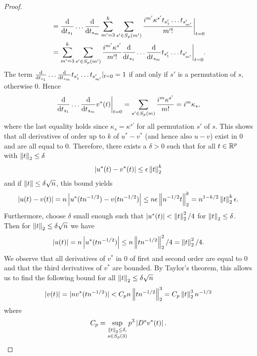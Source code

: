 \begin{proof}
\begin{align*}
        &= \frac{\text{d}}{\text{d} t_{s_1}}\ldots\frac{\text{d}}{\text{d} t_{s_m}} \sum_{m'=3}^k \sum_{s' \in S_p(m')} \frac{i^{m'}\kappa^{s'}t_{s'_1}\ldots t_{s'_{m'}}}{m'!} \bigg|_{t=0} \\
        &= \sum_{m'=3}^k \sum_{s' \in S_p(m')} \frac{i^{m'}\kappa^{s'}}{m'!} \frac{\text{d}}{\text{d} t_{s_1}}\ldots\frac{\text{d}}{\text{d} t_{s_m}}t_{s'_1}\ldots t_{s'_{m'}} \bigg|_{t=0}.
    \end{align*}
    The term $\frac{\text{d}}{\text{d} t_{s_1}}\ldots\frac{\text{d}}{\text{d} t_{s_m}}t_{s'_1}\ldots t_{s'_{m'}} |_{t=0} = 1$ if and only if $s'$ is a permutation of $s$, otherwise 0. Hence
    \begin{equation*}
        \frac{\text{d}}{\text{d} t_{s_1}}\ldots\frac{\text{d}}{\text{d} t_{s_m}} v^*(t) \bigg|_{t=0} 
        = \sum_{s' \in S_p(m)} \frac{i^m\kappa^{s'}}{m!}
        = i^m\kappa_s,
    \end{equation*}
    where the last equality holds since $\kappa_s = \kappa^{s'}$ for all permutation $s'$ of $s$. 
    This shows that all derivatives of order up to $k$ of $u^* - v^*$ (and hence also $u - v$) exist in 0 and are all equal to 0. Therefore, there exists a $\delta > 0$ such that for all $t \in {\mathbb{R}^p}$ with $\left\lVert t\right\rVert_2 \leq \delta$
    \begin{equation*}
        \left|u^*(t) - v^*(t)\right| \leq \epsilon\left\lVert t\right\rVert_2^k
    \end{equation*}
    and if $\left\lVert t\right\rVert \leq \delta \sqrt{n}$, this bound yields
    \begin{equation*}
        \left|u(t) - v(t)\right| = n\left|u^*(t n^{-1/2}) - v(t n^{-1/2})\right| \leq n\epsilon\left\lVert n^{-1/2}t\right\rVert_2^k = n^{1-k/2}\left\lVert t\right\rVert_2^k\epsilon.
    \end{equation*}
    Furthermore, choose $\delta$ small enough such that $\left|u^*(t)\right| < \left\lVert t\right\rVert_2^2/4$ for $\left\lVert t\right\rVert_2 \leq \delta$. Then for $\left\lVert t\right\rVert_2 \leq \delta\sqrt{n}$ we have
    \begin{equation*}
        \left|u(t)\right| = n\left|u^*(t n^{-1/2})\right| \leq n \left\lVert t n^{-1/2}\right\rVert_2^2/4 = \left\lVert t\right\rVert_2^2/4.
    \end{equation*}
    We observe that all derivatives of $v^*$ in 0 of first and second order are equal to 0 and that the third derivatives of $v^*$ are bounded. By Taylor's theorem, this allows us to find the following bound for all $\left\lVert t\right\rVert_2 \leq \delta \sqrt{n}$
    \begin{equation*}
        |v(t)| = |nv^*(t n^{-1/2})| < C_p n \left\lVert t n^{-1/2}\right\rVert_2^3 = C_p \left\lVert t\right\rVert_2^3 n^{-1/2}
    \end{equation*}
    where
    \begin{equation*}
        C_p = \sup_{\substack{\norm{t}_2 \leq \delta, \\ s \in S_p(3)}} p^3\abs{ D^sv^*(t) }.

\end{equation*}
\end{proof}

